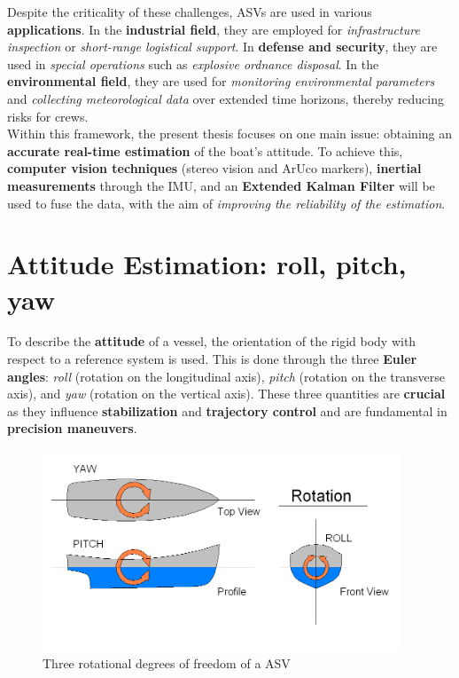 Despite the criticality of these challenges, ASVs are used in various \textbf{applications}. In the \textbf{industrial field}, they are employed for \textit{infrastructure inspection} or \textit{short-range logistical support}. In \textbf{defense and security}, they are used in \textit{special operations} such as \textit{explosive ordnance disposal}. In the \textbf{environmental field}, they are used for \textit{monitoring environmental parameters} and \textit{collecting meteorological data} over extended time horizons, thereby reducing risks for crews.\\

Within this framework, the present thesis focuses on one main issue: obtaining an \textbf{accurate real-time estimation} of the boat’s attitude. To achieve this, \textbf{computer vision techniques} (stereo vision and ArUco markers), \textbf{inertial measurements} through the IMU, and an \textbf{Extended Kalman Filter} will be used to fuse the data, with the aim of \textit{improving the reliability of the estimation}.

\section{Attitude Estimation: roll, pitch, yaw}

To describe the \textbf{attitude} of a vessel, the orientation of the rigid body with respect to a reference system is used. This is done through the three \textbf{Euler angles}\cite{Euler_angles}: \textit{roll} (rotation on the longitudinal axis), \textit{pitch} (rotation on the transverse axis), and \textit{yaw} (rotation on the vertical axis). These three quantities are \textbf{crucial} as they influence \textbf{stabilization} and \textbf{trajectory control} and are fundamental in \textbf{precision maneuvers}.  

\begin{figure}[ht]
  \centering
  \includegraphics[height=6cm]{images/euler_angles.png}
  \caption{Three rotational degrees of freedom of a ASV}\label{unipd-logo}
\end{figure}


